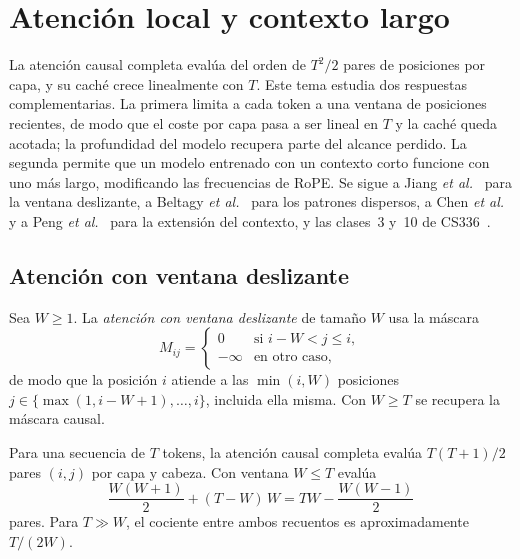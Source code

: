 \chapter{Atención local y contexto largo}
\label{tema:3}

La atención causal completa evalúa del orden de $T^{2}/2$ pares de posiciones por capa, y su caché crece linealmente con $T$. Este tema estudia dos respuestas complementarias. La primera limita a cada token a una ventana de posiciones recientes, de modo que el coste por capa pasa a ser lineal en $T$ y la caché queda acotada; la profundidad del modelo recupera parte del alcance perdido. La segunda permite que un modelo entrenado con un contexto corto funcione con uno más largo, modificando las frecuencias de RoPE. Se sigue a Jiang \emph{et al.}~\cite[§2]{mistral} para la ventana deslizante, a Beltagy \emph{et al.}~\cite[§3.1]{longformer} para los patrones dispersos, a Chen \emph{et al.}~\cite[§2]{pi} y a Peng \emph{et al.}~\cite[§2--3]{yarn} para la extensión del contexto, y las clases~3 y~10 de CS336~\cite{cs336}.

\section{Atención con ventana deslizante}

\begin{definicion}\label{def:swa}
Sea $W\ge 1$. La \emph{atención con ventana deslizante} de tamaño $W$ usa la máscara
\[
M_{ij}=\begin{cases}0&\text{si } i-W<j\le i,\\ -\infty&\text{en otro caso,}\end{cases}
\]
de modo que la posición $i$ atiende a las $\min(i,W)$ posiciones $j\in\{\max(1,i-W+1),\dots,i\}$, incluida ella misma. Con $W\ge T$ se recupera la máscara causal.
\end{definicion}

\begin{proposicion}\label{prop:pares}
Para una secuencia de $T$ tokens, la atención causal completa evalúa $T(T+1)/2$ pares $(i,j)$ por capa y cabeza. Con ventana $W\le T$ evalúa
\[
\frac{W(W+1)}{2}+(T-W)\,W=TW-\frac{W(W-1)}{2}
\]
pares. Para $T\gg W$, el cociente entre ambos recuentos es aproximadamente $T/(2W)$.
\end{proposicion}


